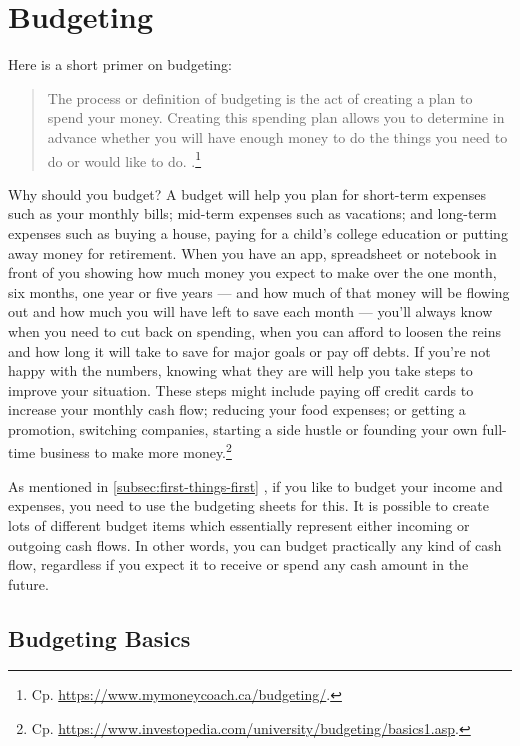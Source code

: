 \section{Budgeting}
\label{section:Budgeting}

Here is a short primer on budgeting:
\begin{quote}\small
	The process or definition of budgeting is the act of creating a plan to spend your money.
	Creating this spending plan allows you to determine in advance whether you will have enough money to do the things you need to do or would like to do. .\footnote{Cp. \url{https://www.mymoneycoach.ca/budgeting/}.}
\end{quote}

Why should you budget? A budget will help you plan for short-term expenses such as your monthly bills; mid-term expenses such as vacations; and long-term expenses such as buying a house, paying for a child’s college education or putting away money for retirement.
When you have an app, spreadsheet or notebook in front of you showing how much money you expect to make over the one month, six months, one year or five years — and how much of that money will be flowing out and how much you will have left to save each month — you’ll always know when you need to cut back on spending, when you can afford to loosen the reins and how long it will take to save for major goals or pay off debts.
If you’re not happy with the numbers, knowing what they are will help you take steps to improve your situation.
These steps might include paying off credit cards to increase your monthly cash flow; reducing your food expenses; or getting a promotion, switching companies, starting a side hustle or founding your own full-time business to make more money.\footnote{Cp. \url{https://www.investopedia.com/university/budgeting/basics1.asp}.}

As mentioned in \autoref{subsec:first-things-first} , if you like to budget your income and expenses, you need to use the budgeting sheets for this.
It is possible to create lots of different budget items which essentially represent either incoming or outgoing cash flows.
In other words, you can budget practically any kind of cash flow, regardless if you expect it to receive or spend any cash amount in the future.

\subsection{Budgeting Basics}
\label{subsec:budgeting-basics}

